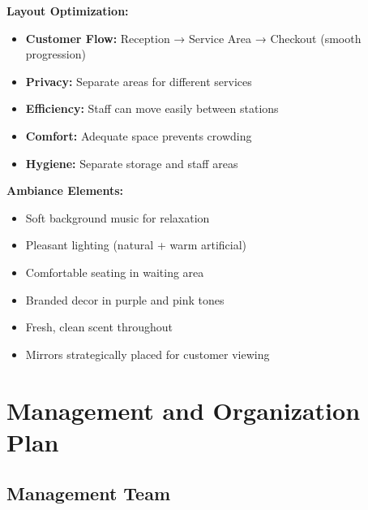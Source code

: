 \documentclass[a4paper,12pt]{article}
\begin{document}
\begin{tcolorbox}[mybox, title=\textbf{Facility Design Principles}]
\textbf{Layout Optimization:}
\begin{itemize}[leftmargin=1em, itemsep=0pt]
    \item \textbf{Customer Flow:} Reception → Service Area → Checkout (smooth progression)
    \item \textbf{Privacy:} Separate areas for different services
    \item \textbf{Efficiency:} Staff can move easily between stations
    \item \textbf{Comfort:} Adequate space prevents crowding
    \item \textbf{Hygiene:} Separate storage and staff areas
\end{itemize}

\textbf{Ambiance Elements:}
\begin{itemize}[leftmargin=1em, itemsep=0pt]
    \item Soft background music for relaxation
    \item Pleasant lighting (natural + warm artificial)
    \item Comfortable seating in waiting area
    \item Branded decor in purple and pink tones
    \item Fresh, clean scent throughout
    \item Mirrors strategically placed for customer viewing
\end{itemize}
\end{tcolorbox}

\newpage
\section{Management and Organization Plan}

\subsection{Management Team}
\end{document}
